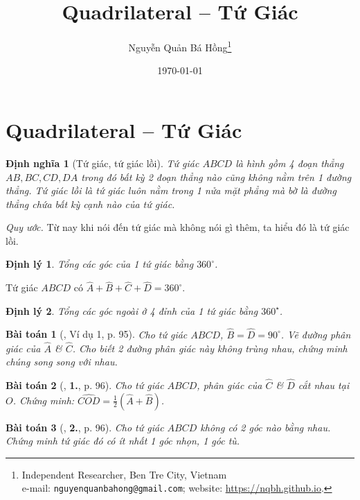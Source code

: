 \documentclass{article}
\title{Quadrilateral -- Tứ Giác}
\author{Nguyễn Quản Bá Hồng\footnote{Independent Researcher, Ben Tre City, Vietnam\\e-mail: \texttt{nguyenquanbahong@gmail.com}; website: \url{https://nqbh.github.io}.}}
\date{\today}
\numberwithin{equation}{section}
\newtheorem{dinhnghia}{Định nghĩa}[section]
\newtheorem{baitoan}{Bài toán}[section]
\newtheorem{dinhly}{Định lý}[section]
\begin{document}
\maketitle
\begin{abstract}
	
\end{abstract}
\setcounter{secnumdepth}{4}
\setcounter{tocdepth}{3}
\tableofcontents


\section{Quadrilateral -- Tứ Giác}

\begin{dinhnghia}[Tứ giác, tứ giác lồi]
	\emph{Tứ giác} $ABCD$ là hình gồm 4 đoạn thẳng $AB,BC,CD,DA$ trong đó bất kỳ 2 đoạn thẳng nào cũng không nằm trên 1 đường thẳng. \emph{Tứ giác lồi} là tứ giác luôn nằm trong 1 nửa mặt phẳng mà bờ là đường thẳng chứa bất kỳ cạnh nào của tứ giác.
\end{dinhnghia}
\textit{Quy ước.} Từ nay khi nói đến tứ giác mà không nói gì thêm, ta hiểu đó là tứ giác lồi.

\begin{dinhly}
	Tổng các góc của 1 tứ giác bằng $360^\circ$.
\end{dinhly}
Tứ giác $ABCD$ có $\widehat{A} + \widehat{B} + \widehat{C} + \widehat{D} = 360^\circ$.

\begin{dinhly}
	Tổng các góc ngoài ở 4 đỉnh của 1 tứ giác bằng $360^\star$.
\end{dinhly}

\begin{baitoan}[\cite{Tuyen_Toan_8}, Ví dụ 1, p. 95]
	Cho tứ giác $ABCD$, $\widehat{B} = \widehat{D} = 90^\circ$. Vẽ đường phân giác của $\widehat{A}$ \& $\widehat{C}$. Cho biết 2 đường phân giác này không trùng nhau, chứng minh chúng song song với nhau.
\end{baitoan}

\begin{baitoan}[\cite{Tuyen_Toan_8}, \textbf{1.}, p. 96]
	Cho tứ giác $ABCD$, phân giác của $\widehat{C}$ \& $\widehat{D}$ cắt nhau tại $O$. Chứng minh: $\widehat{COD} = \frac{1}{2}(\widehat{A} + \widehat{B})$.
\end{baitoan}

\begin{baitoan}[\cite{Tuyen_Toan_8}, \textbf{2.}, p. 96]
	Cho tứ giác $ABCD$ không có 2 góc nào bằng nhau. Chứng minh tứ giác đó có ít nhất 1 góc nhọn, 1 góc tù.
\end{baitoan}
\end{document}
